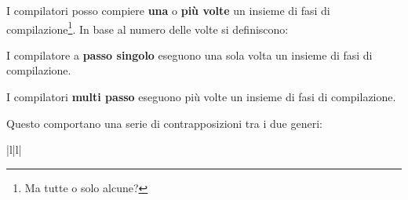 I compilatori posso compiere \textbf{una} o \textbf{più volte} un insieme di
fasi di compilazione\footnote{Ma tutte o solo alcune?}. In base al numero delle
volte si definiscono:

\begin{definition}
I compilatore a \textbf{passo singolo} eseguono una sola volta un insieme di
fasi di compilazione.
\end{definition}

\begin{definition}
I compilatori \textbf{multi passo} eseguono più volte un insieme di fasi di
compilazione.
\end{definition}

Questo comportano una serie di contrapposizioni tra i due generi:

\begin{center}
\begin{table}{|l|l|}
  \hline

\end{table}
\end{center}
